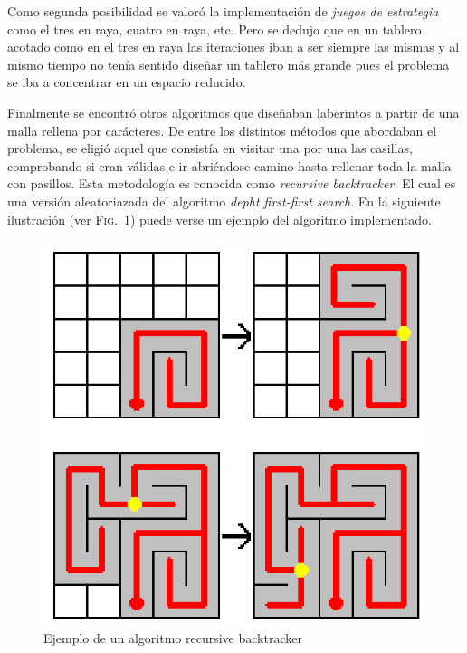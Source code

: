 \documentclass[12pt,a4paper]{article}
\begin{document}
Como segunda posibilidad se valoró la implementación de \textit{juegos de estrategia} como el tres en raya, cuatro en raya, etc. Pero se dedujo que en un tablero acotado como en el tres en raya las iteraciones iban a ser siempre las mismas y al mismo tiempo no tenía sentido diseñar un tablero más grande pues el problema se iba a concentrar en un espacio reducido.

\vspace{0.2cm}

Finalmente se encontró otros algoritmos que diseñaban laberintos a partir de una malla rellena por carácteres. De entre los distintos métodos que abordaban el problema, se eligió aquel que consistía en visitar una por una las casillas, comprobando si eran válidas e ir abriéndose camino hasta rellenar toda la malla con pasillos. Esta metodología es conocida como \textit{recursive backtracker}\cite{wiki}. El cual es una versión aleatoriazada del algoritmo \textit{depht first-first search}. En la siguiente ilustración (ver \textsc{Fig.}~\ref{back_tracker_label}) puede verse un ejemplo del algoritmo implementado.

\begin{figure}[H]
	\centering
	\includegraphics[scale=0.4]{fotos/back_tracker.png}
	\caption{Ejemplo de un algoritmo recursive backtracker \cite{back_tracker}}
	\label{back_tracker_label}
\end{figure}
\end{document}
